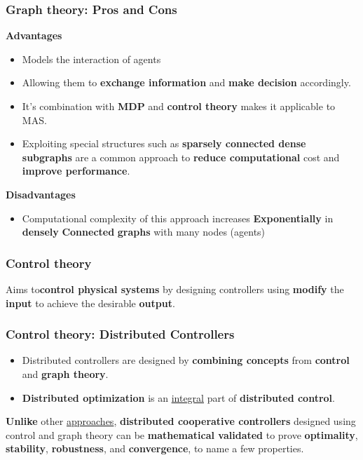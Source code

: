 \documentclass{beamer}
\begin{document}
	\begin{frame}
		\frametitle{Graph theory: Pros and Cons}
		\textbf{Advantages}
		\begin{itemize}
			\item Models the interaction of agents
			\item Allowing them to \textbf{exchange information} and \textbf{make decision} accordingly.
			\item It's combination with \textbf{MDP} and \textbf{control theory} makes it applicable to MAS.
			\item Exploiting special structures such as \textbf{sparsely connected dense subgraphs} are a common approach to \textbf{reduce computational} cost and \textbf{improve performance}.
		\end{itemize}
		
		\textbf{Disadvantages}
		\begin{itemize}
			\item  Computational complexity of this approach increases \textbf{Exponentially} in \textbf{densely} \textbf{Connected} \textbf{graphs} with many nodes (agents)
		\end{itemize}
	
	\end{frame}

	\begin{frame}
		\frametitle{Control theory}
		Aims to\textbf {control physical systems} by designing controllers using \textbf{modify} the \textbf{input} to achieve the desirable \textbf{output}.
	\end{frame}
		
	\begin{frame}
		\frametitle{Control theory: Distributed Controllers}
		\begin{itemize}
			\item Distributed controllers are designed by \textbf{combining concepts} from \textbf{control} and \textbf{graph theory}. 
			\item \textbf{Distributed optimization} is an \underline{integral} part of \textbf{distributed control}.
		\end{itemize}
		\textbf{Unlike} other \underline{approaches}, \textbf{distributed cooperative controllers} designed using control and graph theory can be \textbf{mathematical validated} to prove \textbf{optimality}, \textbf{stability}, \textbf{robustness}, and \textbf{convergence}, to name a few properties.
	\end{frame}
\end{document}
